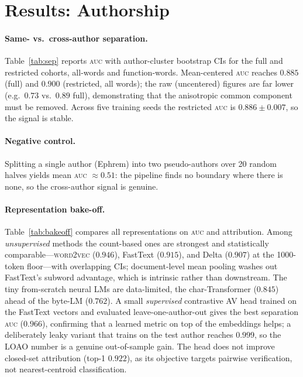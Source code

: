 \documentclass[11pt]{article}
\newcommand{\auc}{\textsc{auc}}
\newcommand{\auc}{\textsc{auc}}
\begin{document}


\section{Results: Authorship}
\label{sec:results-style}

\paragraph{Same- vs.\ cross-author separation.}
Table~\ref{tab:sep} reports \auc{} with author-cluster bootstrap CIs for the full
and restricted cohorts, all-words and function-words. Mean-centered \auc{}
reaches $0.885$ (full) and $0.900$ (restricted, all words); the raw (uncentered)
figures are far lower (e.g.\ $0.73$ vs.\ $0.89$ full), demonstrating that the
anisotropic common component must be removed. Across five training seeds the
restricted \auc{} is $0.886\pm0.007$, so the signal is stable.



\paragraph{Negative control.}
Splitting a single author (Ephrem) into two pseudo-authors over 20 random halves
yields mean \auc{} $\approx 0.51$: the pipeline finds no boundary where there is
none, so the cross-author signal is genuine.

\paragraph{Representation bake-off.}
Table~\ref{tab:bakeoff} compares all representations on \auc{} and attribution.
Among \emph{unsupervised} methods the count-based ones are strongest and
statistically comparable---\textsc{word2vec} ($0.946$), FastText ($0.915$), and
Delta ($0.907$) at the 1000-token floor---with overlapping CIs; document-level
mean pooling washes out FastText's subword advantage, which is intrinsic rather
than downstream. The tiny from-scratch neural LMs are data-limited, the
char-Transformer ($0.845$) ahead of the byte-LM ($0.762$). A small
\emph{supervised} contrastive AV head trained on the FastText vectors and
evaluated leave-one-author-out gives the best separation \auc{} ($0.966$),
confirming that a learned metric on top of the embeddings helps; a deliberately
leaky variant that trains on the test author reaches $0.999$, so the LOAO number
is a genuine out-of-sample gain. The head does not improve closed-set
attribution (top-1 $0.922$), as its objective targets pairwise verification, not
nearest-centroid classification.
\end{document}
